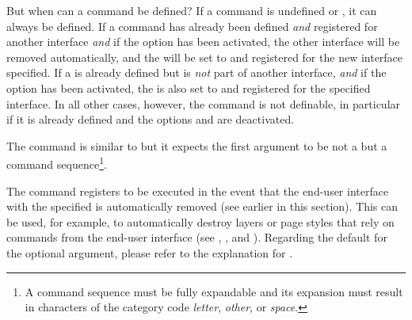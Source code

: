 But when can a command be defined? If a command is undefined or ,
it can always be defined. If a command has already been defined \emph{and}
registered for another interface \emph{and} if the \KOMAScript{} option
 has been activated, the other interface will be
removed automatically, and the  will be set to 
and registered for the new interface specified. If a  is
already defined but is \emph{not} part of another interface, \emph{and} if the
\KOMAScript{} option  has been activated, the
 is also set to  and registered for the specified
interface. In all other cases, however, the command is not definable, in
particular if it is already defined and the \KOMAScript{} options
 and  are deactivated.

The  command is similar to
 but it expects the first argument to be not a
 but a command sequence\footnote{A command sequence must be
  fully expandable and its expansion must result in characters of the category
  code \emph{letter}, \emph{other}, or \emph{space}.}.%
\EndIndexGroup


\begin{Declaration}
\end{Declaration}
The  command registers  to be
executed in the event that the end-user interface with the specified
 is automatically removed (see
 earlier in this section).
This can be used, for example, to automatically destroy layers or page styles
that rely on commands from the end-user interface (see
,
, and
). Regarding the default for
the optional argument, please refer to the explanation for
.%
\EndIndexGroup%
\fi%
%
\EndIndexGroup



